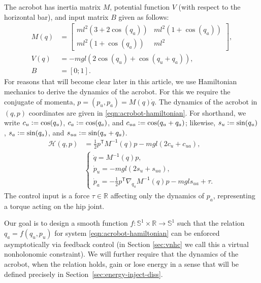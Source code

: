 \documentclass[journal,twoside,web, twocolumn,draftcls]{ieeecolor}
\newcommand*{\tpose}{^\mathsf{T}}
\newcommand*{\R}{\mathbb{R}}
\newcommand*{\Sone}{\mathbb{S}^1}
\newcommand*{\Minv}{M^\mathsf{-1}}
\newcommand*{\eqdef}{\vcentcolon=}
\begin{document}
The acrobot has inertia matrix 
\(M\), potential function \(V\) (with respect to
the horizontal bar), and input matrix \(B\) given as follows:
\begin{align}\label{eqn:acrobot-inertia}
    M(q) &= \begin{bmatrix}
        ml^2\left(3+2\cos(q_a)\right) & 
        ml^2\left(1+\cos(q_a)\right) \\
        ml^2\left(1+\cos(q_a)\right) &
        ml^2
    \end{bmatrix} 
    , \\
    \label{eqn:acrobot-potential}
    V(q) &= -mgl\left(2\cos(q_u)+\cos(q_u+q_a)\right)
    , \\
    \label{eqn:acrobot-B}
    B &= [0;1]
    .
\end{align}
For reasons that will become clear later in this article, we
use Hamiltonian mechanics to derive the dynamics of the acrobot. 
For this we require the conjugate of momenta, \(p = (p_u,p_a) = M(q)\dot{q}\).
The dynamics of the acrobot in \((q,p)\) coordinates are given in
\eqref{eqn:acrobot-hamiltonian}.
For shorthand, we write \(c_u \eqdef \cos(q_u)\), \(c_a \eqdef \cos(q_a)\), and 
\(c_{ua} \eqdef \cos(q_u + q_a)\); likewise, \(s_u \eqdef \sin(q_u)\), 
\(s_a \eqdef \sin(q_a)\), and \(s_{ua} \eqdef \sin(q_u + q_a)\).
\begin{align}\label{eqn:acrobot-hamiltonian}
    \mathcal{H}(q,p) &= \frac{1}{2}p\tpose \Minv(q) p -
    mgl\left(2 c_u + c_{ua}\right)
    , \\
     &\begin{cases}
        \dot{q} = \Minv(q) p 
        ,\\
        \dot{p}_u = -mgl\left(2s_u + s_{ua}\right) 
        ,\\
        \dot{p}_a =-\frac{1}{2}p\tpose \nabla_{q_a}\Minv(q) p
        - mgl s_{ua} + \tau.
    \end{cases} \nonumber
\end{align}
The control input is a force \(\tau \in \R\) affecting only the dynamics of
\(p_a\), representing a torque acting on the hip joint.

Our goal is to design a smooth function \(f : \Sone \times \R \to \Sone\) such that the
relation \(q_a = f(q_u,p_u)\) for system \eqref{eqn:acrobot-hamiltonian} can be
enforced asymptotically via feedback control (in Section \ref{sec:vnhc} we call
this a  virtual nonholonomic constraint).   We will further require that the
dynamics of the acrobot, when the relation holds, gain or lose energy in a sense
that will be defined precisely in Section~\ref{sec:energy-inject-diss}.
\end{document}
